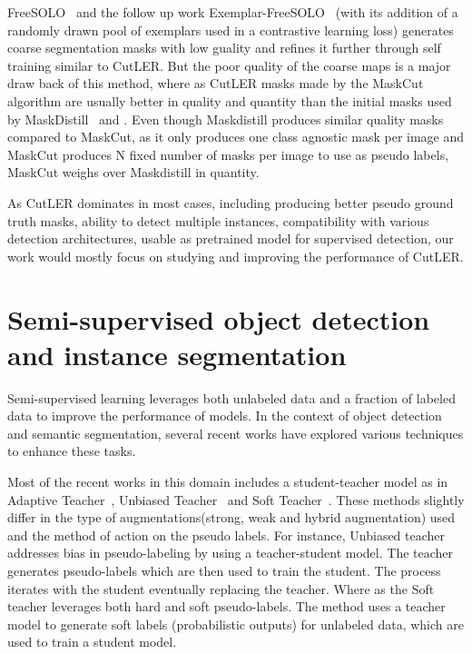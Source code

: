 FreeSOLO~\cite{wang2022freesolo} and the follow up work Exemplar-FreeSOLO~\cite{Ishtiak_2023_CVPR} (with its addition of a randomly drawn pool of exemplars used in a contrastive learning loss) generates coarse segmentation masks with low guality and refines it further through self training similar to CutLER. But the poor quality of the coarse maps is a major draw back of this method, where as CutLER masks made by the MaskCut~\cite{wang2023cut, wang2022tokencut} algorithm are usually better in quality and quantity than the initial masks used by MaskDistill~\cite{vangansbeke2022discovering} and \cite{wang2022freesolo}. Even though Maskdistill produces similar quality masks compared to MaskCut, as it only produces one class agnostic mask per image and MaskCut produces N fixed number of masks per image to use as pseudo labels, MaskCut weighs over Maskdistill in quantity.

As CutLER dominates in most cases, including producing better pseudo ground truth masks, ability to detect multiple instances, compatibility with various detection architectures, usable as pretrained model for supervised detection, our work would mostly focus on studying and improving the performance of CutLER.

\section{Semi-supervised object detection and instance segmentation}
Semi-supervised learning leverages both unlabeled data and a fraction of labeled data to improve the performance of models. In the context of object detection and semantic segmentation, several recent works have explored various techniques to enhance these tasks.

Most of the recent works in this domain includes a student-teacher model as in  Adaptive Teacher~\cite{Li_2022_CVPR}, Unbiased Teacher~\cite{liu2021unbiasedteachersemisupervisedobject} and Soft Teacher~\cite{xu2021endtoendsemisupervisedobjectdetection}. These methods slightly differ in the type of augmentations(strong, weak and hybrid augmentation) used and the method of action on the pseudo labels. For instance, Unbiased teacher addresses bias in pseudo-labeling by using a teacher-student model. The teacher generates pseudo-labels which are then used to train the student. The process iterates with the student eventually replacing the teacher. Where as the Soft teacher leverages both hard and soft pseudo-labels. The method uses a teacher model to generate soft labels (probabilistic outputs) for unlabeled data, which are used to train a student model.

